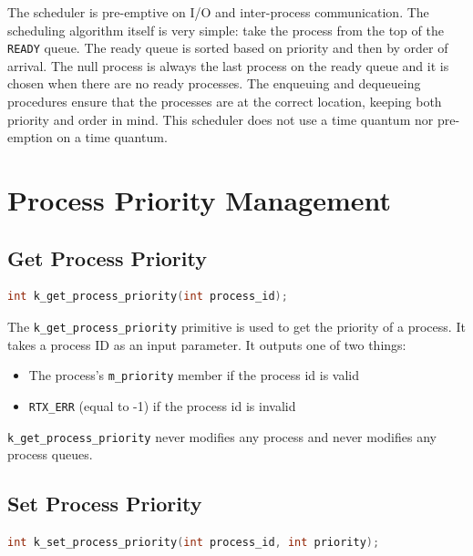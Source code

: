 \documentclass[12pt]{report}
\begin{document}
The scheduler is pre-emptive on I/O and inter-process communication.
The scheduling algorithm itself is very simple: take the process from the top of the {\tt READY} queue. The ready queue is sorted based on priority and then by order of arrival. The null process is always the last process on the ready queue and it is chosen when there are no ready processes. The enqueuing and dequeueing procedures ensure that the processes are at the correct location, keeping both priority and order in mind. This scheduler does not use a time quantum nor pre-emption on a time quantum.\\


\section{Process Priority Management}

\subsection{Get Process Priority}

\begin{minipage}{\textwidth}
\begin{lstlisting}[language=C, frame=single]
int k_get_process_priority(int process_id);
\end{lstlisting}
\end{minipage}

The {\tt k\_get\_process\_priority} primitive is used to get the priority of a process. It takes a process ID as an input parameter. It outputs one of two things:

\begin{itemize}
\item The process's {\tt m\_priority} member if the process id is valid
\item {\tt RTX\_ERR} (equal to -1) if the process id is invalid
\end{itemize}

{\tt k\_get\_process\_priority} never modifies any process and never modifies any process queues.\\

\subsection{Set Process Priority}

\begin{minipage}{\textwidth}
\begin{lstlisting}[language=C, frame=single]
int k_set_process_priority(int process_id, int priority);
\end{lstlisting}
\end{minipage}
\end{document}
